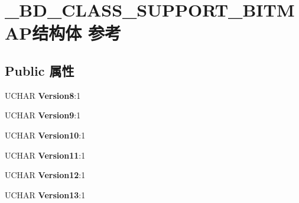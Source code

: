 \hypertarget{struct___b_d___c_l_a_s_s___s_u_p_p_o_r_t___b_i_t_m_a_p}{}\section{\+\_\+\+B\+D\+\_\+\+C\+L\+A\+S\+S\+\_\+\+S\+U\+P\+P\+O\+R\+T\+\_\+\+B\+I\+T\+M\+A\+P结构体 参考}
\label{struct___b_d___c_l_a_s_s___s_u_p_p_o_r_t___b_i_t_m_a_p}
\subsection*{Public 属性}
\begin{DoxyCompactItemize}
\item 
\mbox{\label{struct___b_d___c_l_a_s_s___s_u_p_p_o_r_t___b_i_t_m_a_p_a754a114fe4a3dae30a1e200436823a44}} 
U\+C\+H\+AR {\bfseries Version8}\+:1
\item 
\mbox{\label{struct___b_d___c_l_a_s_s___s_u_p_p_o_r_t___b_i_t_m_a_p_a943f58f846b457098c7b3ab43b7ea0b9}} 
U\+C\+H\+AR {\bfseries Version9}\+:1
\item 
\mbox{\label{struct___b_d___c_l_a_s_s___s_u_p_p_o_r_t___b_i_t_m_a_p_a390c834a2bb6071df3f4a87720501030}} 
U\+C\+H\+AR {\bfseries Version10}\+:1
\item 
\mbox{\label{struct___b_d___c_l_a_s_s___s_u_p_p_o_r_t___b_i_t_m_a_p_aef7f4e8ebf9cb4387f2bae4e61eecacb}} 
U\+C\+H\+AR {\bfseries Version11}\+:1
\item 
\mbox{\label{struct___b_d___c_l_a_s_s___s_u_p_p_o_r_t___b_i_t_m_a_p_a86afe99afb21504d8ecb1e54f1d6e514}} 
U\+C\+H\+AR {\bfseries Version12}\+:1
\item 
\mbox{\label{struct___b_d___c_l_a_s_s___s_u_p_p_o_r_t___b_i_t_m_a_p_acf93b2594f475e863f1990cef3fcdd8a}} 
U\+C\+H\+AR {\bfseries Version13}\+:1
\item 

\end{DoxyCompactItemize}
